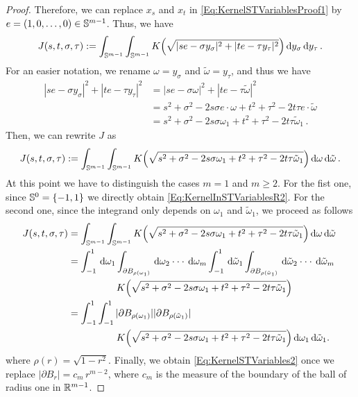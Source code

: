 \begin{proof}
Therefore, we can replace $x_s$ and $x_t$ in \eqref{Eq:KernelSTVariablesProof1} by $e =(1,0,\ldots,
0) \in \mathbb{S}^{m-1}$. Thus, we have
\begin{equation}
\label{Eq:KernelSTVariablesProof2}
J(s,t,\sigma, \tau) := \int_{\mathbb{S}^{m-1}}  \int_{\mathbb{S}^{m-1}} K\Big( \sqrt{|s e - \sigma y_\sigma|^2 + |t e - \tau y_\tau|^2 }\Big) \,\mathrm{d} y_\sigma \,\mathrm{d} y_\tau \,.
\end{equation}
For an easier notation, we rename $\omega = y_\sigma$ and $\tilde\omega = y_\tau$, and thus we have
\begin{align*}
|s e - \sigma y_\sigma|^2 + |t e - \tau y_\tau|^2 &= |s e - \sigma \omega|^2 + |t e - \tau \tilde\omega|^2\\
&= s^2 +\sigma^2 - 2 s \sigma e \cdot \omega + t^2 + \tau^2 - 2 t \tau e\cdot \tilde\omega \\
&= s^2 +\sigma^2 - 2 s \sigma \omega_1 + t^2 + \tau^2 - 2t \tau\tilde\omega_1\,.
\end{align*}
Then, we can rewrite $J$ as
\begin{equation*}
\label{Eq:KernelSTVariablesProof3}
J(s,t,\sigma, \tau) := \int_{\mathbb{S}^{m-1}}  \int_{\mathbb{S}^{m-1}} K\Big( \sqrt{s^2+\sigma^2- 2 s \sigma \omega_1 + t^2 + \tau^2 - 2t \tau\tilde\omega_1}\Big) \,\mathrm{d} \omega \,\mathrm{d} \tilde\omega \,.
\end{equation*}
At this point we have to distinguish the cases $m=1$ and $m\geq 2$. For the fist one, since
$\mathbb{S}^{0} = \{-1,1\}$ we directly obtain \eqref{Eq:KernelInSTVariablesR2}. For the second one,
since the integrand only depends on $\omega_1$ and $\tilde\omega_1$, we proceed as follows
\begin{align*}
\label{Eq:KernelSTVariablesProof4}
J(s,t,\sigma, \tau) &= \int_{\mathbb{S}^{m-1}}  \int_{\mathbb{S}^{m-1}} K\Big( \sqrt{s^2+\sigma^2- 2 s \sigma \omega_1 + t^2 + \tau^2 - 2t \tau\tilde\omega_1}\Big) \,\mathrm{d} \omega \,\mathrm{d} \tilde\omega \,\\
&= \int_{-1}^1 \,\mathrm{d} \omega_1 \int_{\partial B_{\rho(\omega_1)}} \,\mathrm{d} \omega_2\cdot\cdot\cdot\,\mathrm{d} \omega_m \int_{-1}^1 \,\mathrm{d} \tilde\omega_1 \int_{\partial B_{\rho(\tilde\omega_1)}} \,\mathrm{d} \tilde\omega_2\cdot\cdot\cdot\,\mathrm{d} \tilde\omega_m  \\
& \quad \quad \quad \quad \quad K\Big( \sqrt{s^2+\sigma^2- 2 s \sigma \omega_1 + t^2 + \tau^2 - 2t \tau\tilde\omega_1}\Big) \, \\
&= \int_{-1}^1 \int_{-1}^1  |\partial B_{\rho(\omega_1)}| |\partial B_{\rho(\tilde\omega_1)}|\,\\
& \quad \quad \quad \quad \quad K\Big( \sqrt{s^2+\sigma^2- 2 s \sigma \omega_1 + t^2 + \tau^2 - 2t \tau\tilde\omega_1}\Big) \,\mathrm{d} \omega_1 \,\mathrm{d} \tilde\omega_1.
\end{align*}
where $\rho(r) = \sqrt{1-r^2}$. Finally, we obtain \eqref{Eq:KernelSTVariables2} once we replace
$|\partial B_{r}|=c_m\,r^{m-2}$, where $c_m$ is the measure of the boundary of the ball of radius one in
$\mathbb{R}^{m-1}$.
\end{proof}

